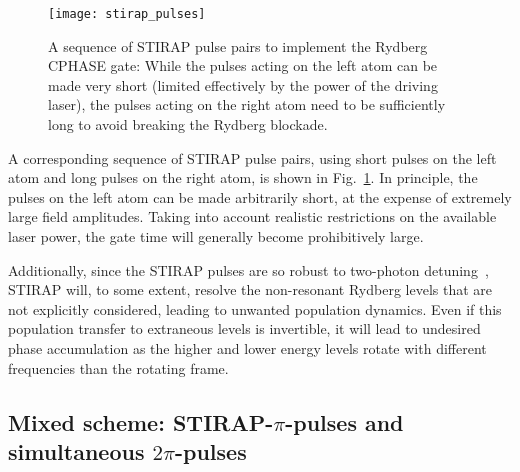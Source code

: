 \begin{figure}[tb]
  \begin{center}
    \texttt{[image: stirap\_pulses]}
  \end{center}
  \caption{%
    A sequence of STIRAP pulse pairs to implement the
    Rydberg CPHASE gate: While the pulses acting on the left atom
    can be made very short (limited effectively by the power of the driving
    laser), the pulses acting on the right atom need to be sufficiently long to
    avoid breaking the Rydberg blockade.
  }
  \label{fig:Stirap}
\end{figure}
A corresponding  sequence of STIRAP pulse pairs, using short pulses on the left
atom and long pulses on the right atom,  is shown in Fig.~\ref{fig:Stirap}.
In principle, the pulses on the left atom can be made arbitrarily short,
at the expense of extremely large field amplitudes. Taking into account
realistic restrictions on the available laser power, the gate time will
generally become prohibitively large.

Additionally, since the STIRAP pulses are so robust to two-photon
detuning~\cite{grigoryan2001adiabatic}, STIRAP will, to some extent, resolve the
non-resonant Rydberg levels that are not explicitly considered, leading to
unwanted population dynamics. Even if this population transfer to extraneous
levels is invertible, it will lead to undesired phase accumulation as the higher
and lower energy levels rotate with different frequencies than the rotating
frame.

\subsection{Mixed scheme: STIRAP-$\pi$-pulses and simultaneous
  $2\pi$-pulses}
\label{subsec:RydMixed}

